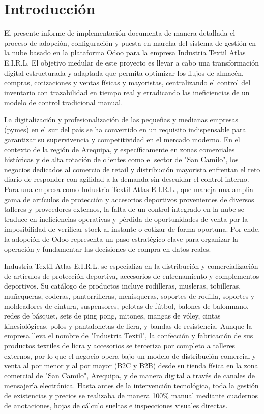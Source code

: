 \section{Introducción}
El presente informe de implementación documenta de manera detallada el proceso de adopción, configuración y puesta en marcha del sistema de gestión en la nube basado en la plataforma Odoo para la empresa Industria Textil Atlas E.I.R.L. El objetivo medular de este proyecto es llevar a cabo una transformación digital estructurada y adaptada que permita optimizar los flujos de almacén, compras, cotizaciones y ventas físicas y mayoristas, centralizando el control del inventario con trazabilidad en tiempo real y erradicando las ineficiencias de un modelo de control tradicional manual.

La digitalización y profesionalización de las pequeñas y medianas empresas (pymes) en el sur del país se ha convertido en un requisito indispensable para garantizar su supervivencia y competitividad en el mercado moderno. En el contexto de la región de Arequipa, y específicamente en zonas comerciales históricas y de alta rotación de clientes como el sector de "San Camilo", los negocios dedicados al comercio de retail y distribución mayorista enfrentan el reto diario de responder con agilidad a la demanda sin descuidar el control interno. Para una empresa como Industria Textil Atlas E.I.R.L., que maneja una amplia gama de artículos de protección y accesorios deportivos provenientes de diversos talleres y proveedores externos, la falta de un control integrado en la nube se traduce en ineficiencias operativas y pérdida de oportunidades de venta por la imposibilidad de verificar stock al instante o cotizar de forma oportuna. Por ende, la adopción de Odoo representa un paso estratégico clave para organizar la operación y fundamentar las decisiones de compra en datos reales.

Industria Textil Atlas E.I.R.L. se especializa en la distribución y comercialización de artículos de protección deportiva, accesorios de entrenamiento y complementos deportivos. Su catálogo de productos incluye rodilleras, musleras, tobilleras, muñequeras, coderas, pantorrilleras, menisqueras, soportes de rodilla, soportes y moldeadores de cintura, suspensores, pelotas de fútbol, balones de balonmano, redes de básquet, sets de ping pong, mitones, mangas de vóley, cintas kinesiológicas, polos y pantalonetas de licra, y bandas de resistencia. Aunque la empresa lleva el nombre de "Industria Textil", la confección y fabricación de sus productos textiles de licra y accesorios se terceriza por completo a talleres externos, por lo que el negocio opera bajo un modelo de distribución comercial y venta al por menor y al por mayor (B2C y B2B) desde su tienda física en la zona comercial de "San Camilo", Arequipa, y de manera digital a través de canales de mensajería electrónica. Hasta antes de la intervención tecnológica, toda la gestión de existencias y precios se realizaba de manera 100\% manual mediante cuadernos de anotaciones, hojas de cálculo sueltas e inspecciones visuales directas.

